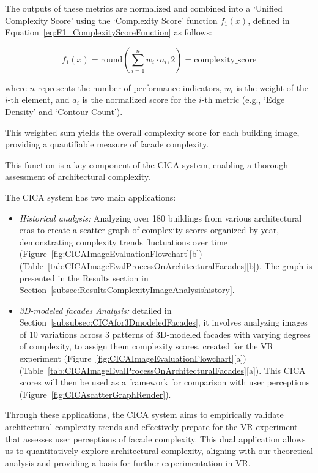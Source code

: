 The outputs of these metrics are normalized and combined into a `Unified Complexity Score' using the `Complexity Score' function \(f_1(x)\), defined in Equation~\ref{eq:F1_ComplexityScoreFunction} as follows:

\begin{equation}
    f_1(x) = \mathrm{round}\left(\sum_{i=1}^{n} w_i \cdot a_i, 2\right) = \text{complexity\_score}
    \label{eq:F1_ComplexityScoreFunction}
\end{equation}

where \(n\) represents the number of performance indicators, \(w_i\) is the weight of the \(i\)-th element, and \(a_i\) is the normalized score for the \(i\)-th metric (e.g., `Edge Density' and `Contour Count').

This weighted sum yields the overall complexity score for each building image, providing a quantifiable measure of facade complexity.

This function is a key component of the CICA system,
enabling a thorough assessment of architectural complexity.

The CICA system has two main applications:
\begin{itemize}
    \item \textit{Historical analysis:}  Analyzing over 180 buildings from various architectural eras to create a scatter graph of complexity scores organized by year, demonstrating complexity trends fluctuations over time (Figure~\ref{fig:CICAImageEvaluationFlowchart}[b])(Table~\ref{tab:CICAImageEvalProcessOnArchitecturalFacades}[b]). The graph is presented in the Results section in Section~\ref{subsec:ResultsComplexityImageAnalysishistory}.
    \item \textit{3D-modeled facades Analysis:} detailed in Section~\ref{subsubsec:CICAfor3DmodeledFacades}, it involves analyzing images of 10 variations across 3 patterns of 3D-modeled facades with varying degrees of complexity, to assign them complexity scores, created for the VR experiment  (Figure~\ref{fig:CICAImageEvaluationFlowchart}[a])(Table~\ref{tab:CICAImageEvalProcessOnArchitecturalFacades}[a]). This CICA scores will then be used as a framework for comparison with user perceptions (Figure~\ref{fig:CICAscatterGraphRender}).
\end{itemize}

Through these applications, the CICA system aims to empirically validate architectural complexity trends and effectively prepare for the VR experiment that assesses user perceptions of facade complexity.
This dual application allows us to quantitatively explore architectural complexity, aligning with our theoretical analysis and providing a basis for further experimentation in VR\@.


